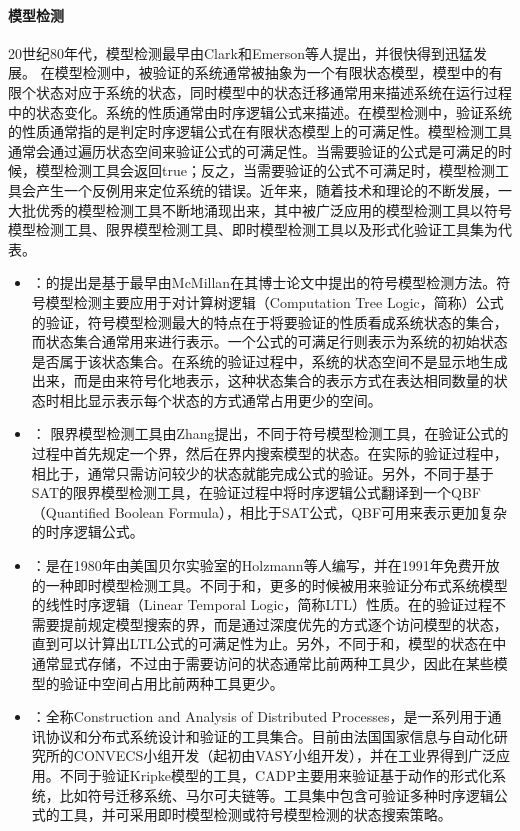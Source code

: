 \paragraph{模型检测}
20世纪80年代，模型检测\cite{CGP01,BouajjaniJNT00,BaierKatoen08}最早由Clark和Emerson等人提出，并很快得到迅猛发展。
在模型检测中，被验证的系统通常被抽象为一个有限状态模型，模型中的有限个状态对应于系统的状态，同时模型中的状态迁移通常用来描述系统在运行过程中的状态变化。系统的性质通常由时序逻辑公式来描述。在模型检测中，验证系统的性质通常指的是判定时序逻辑公式在有限状态模型上的可满足性。模型检测工具通常会通过遍历状态空间来验证公式的可满足性。当需要验证的公式是可满足的时候，模型检测工具会返回true；反之，当需要验证的公式不可满足时，模型检测工具会产生一个反例用来定位系统的错误。近年来，随着技术和理论的不断发展，一大批优秀的模型检测工具不断地涌现出来，其中被广泛应用的模型检测工具以符号模型检测工具\nusmv{}\cite{CimattiCGR99}、限界模型检测工具\verds{}\cite{Zhang14}、即时模型检测工具\cite{Holzmann97}以及形式化验证工具集\CADP{}\cite{GaravelLMS13}为代表。
\begin{itemize}
	\item \nusmv{}：\nusmv{}的提出是基于最早由McMillan在其博士论文\cite{mcmillan93}中提出的符号模型检测方法。符号模型检测主要应用于对计算树逻辑（Computation Tree Logic，简称\CTL{}）公式的验证，符号模型检测最大的特点在于将要验证的性质看成系统状态的集合，而状态集合通常用\BDD{}\cite{Bryant86}来进行表示。一个\CTL{}公式的可满足行则表示为系统的初始状态是否属于该状态集合。在系统的验证过程中，系统的状态空间不是显示地生成出来，而是由\BDD{}来符号化地表示，这种状态集合的表示方式在表达相同数量的状态时相比显示表示每个状态的方式通常占用更少的空间。
	\item \verds{}：
	限界模型检测工具\verds{}由Zhang\cite{Zhang14}提出，不同于符号模型检测工具，\verds{}在验证公式的过程中首先规定一个界，然后在界内搜索模型的状态。在实际的验证过程中，相比于\nusmv{}，\verds{}通常只需访问较少的状态就能完成公式的验证。另外，不同于基于\textsf{SAT}\cite{BCCZ99}的限界模型检测工具，\verds{}在验证过程中将时序逻辑公式翻译到一个\textsf{QBF}（Quantified Boolean Formula），相比于\textsf{SAT}公式，\textsf{QBF}可用来表示更加复杂的时序逻辑公式。
	\item {}：是在1980年由美国贝尔实验室的Holzmann等人编写，并在1991年免费开放的一种即时模型检测工具。不同于\nusmv{}和\verds{}，更多的时候被用来验证分布式系统模型的线性时序逻辑（Linear Temporal Logic，简称\textsf{LTL}）性质。在的验证过程不需要提前规定模型搜索的界，而是通过深度优先的方式逐个访问模型的状态，直到可以计算出\textsf{LTL}公式的可满足性为止。另外，不同于\nusmv{}和\verds{}，模型的状态在中通常显式存储，不过由于需要访问的状态通常比前两种工具少，因此在某些模型的验证中空间占用比前两种工具更少。
	\item {}：全称Construction and Analysis of Distributed Processes，是一系列用于通讯协议和分布式系统设计和验证的工具集合。目前由法国国家信息与自动化研究所的\textsf{CONVECS}小组开发（起初由\textsf{VASY}小组开发），并在工业界得到广泛应用。不同于验证Kripke模型的工具，\textsf{CADP}主要用来验证基于动作的形式化系统，比如符号迁移系统、马尔可夫链等。\CADP{}工具集中包含可验证多种时序逻辑公式的工具，并可采用即时模型检测或符号模型检测的状态搜索策略。
\end{itemize}

